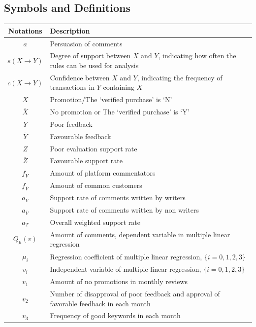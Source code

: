 \documentclass[12pt,a4paper]{article}
\begin{document}
\begin{spacing}{1.2}
\subsection{Symbols and Definitions}

\begin{table}[h]
\renewcommand{\arraystretch}{1.2}
\begin{center}
{\footnotesize
\begin{tabular}{c l}
\toprule
{Notations} & {Description} \\
\midrule
$a$    & {Persuasion of comments} \\
$s(X\rightarrow Y)$  &  {Degree of support between $X$ and $Y$,  indicating how often the rules can be used for analysis}\\
$c(X\rightarrow Y)$  &  {Confidence between $X$ and $Y$, indicating the frequency of transactions in $Y$ containing $X$} \\
$X$ & {Promotion/The `verified purchase' is `N'} \\
$\overline{X}$ & {No promotion or The `verified purchase' is `Y'} \\
$Y$ & {Poor feedback} \\
$\overline{Y}$ & {Favourable feedback} \\
$Z$ & {Poor evaluation support rate} \\
$\overline{Z}$ & {Favourable support rate} \\
$f_{V}$ & {Amount of platform commentators} \\
$f_{\overline{V}}$ & {Amount of common customers} \\
$a_{V}$ & {Support rate of comments written by writers} \\
$a_{\overline{V}}$ & {Support rate of comments written by non writers} \\
$a_{T}$ & {Overall weighted support rate} \\
$Q_\mu(v)$ & {Amount of comments, dependent variable in multiple linear regression} \\
$\mu_i$ & {Regression coefficient of multiple linear regression, $\lbrace i=0, 1, 2, 3 \rbrace$} \\
$v_i$ & {Independent variable of multiple linear regression, $\lbrace i=0, 1, 2, 3 \rbrace$} \\
$v_1$ & {Amount of no promotions in monthly reviews} \\
$v_2$ & {Number of disapproval of poor feedback and approval of favorable feedback in each month} \\
$v_3$ & {Frequency of good keywords in each month} \\

\end{tabular}}
\end{center}
\end{table}
\end{spacing}
\end{document}
